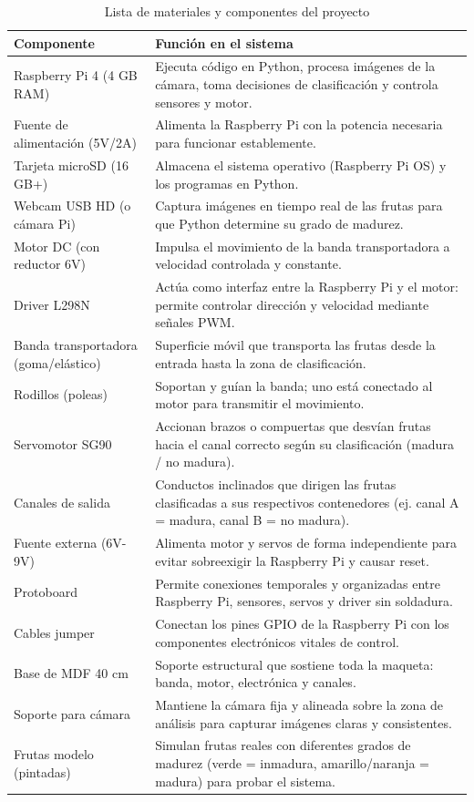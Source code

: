 \begin{table}[H]
\centering
\caption{Lista de materiales y componentes del proyecto}
\begin{tabular}{|p{}|p{}|}
\hline
\textbf{Componente} & \textbf{Función en el sistema} \\
\hline
Raspberry Pi 4 (4 GB RAM) & Ejecuta código en Python, procesa imágenes de la cámara, toma decisiones de clasificación y controla sensores y motor. \\
\hline
Fuente de alimentación (5V/2A) & Alimenta la Raspberry Pi con la potencia necesaria para funcionar establemente. \\
\hline
Tarjeta microSD (16 GB+) & Almacena el sistema operativo (Raspberry Pi OS) y los programas en Python. \\
\hline
Webcam USB HD (o cámara Pi) & Captura imágenes en tiempo real de las frutas para que Python determine su grado de madurez. \\
\hline
Motor DC (con reductor 6V) & Impulsa el movimiento de la banda transportadora a velocidad controlada y constante. \\
\hline
Driver L298N & Actúa como interfaz entre la Raspberry Pi y el motor: permite controlar dirección y velocidad mediante señales PWM. \\
\hline
Banda transportadora (goma/elástico) & Superficie móvil que transporta las frutas desde la entrada hasta la zona de clasificación. \\
\hline
Rodillos (poleas) & Soportan y guían la banda; uno está conectado al motor para transmitir el movimiento. \\
\hline
Servomotor SG90 & Accionan brazos o compuertas que desvían frutas hacia el canal correcto según su clasificación (madura / no madura). \\
\hline
Canales de salida & Conductos inclinados que dirigen las frutas clasificadas a sus respectivos contenedores (ej. canal A = madura, canal B = no madura). \\
\hline
Fuente externa (6V-9V) & Alimenta motor y servos de forma independiente para evitar sobreexigir la Raspberry Pi y causar reset. \\
\hline
Protoboard & Permite conexiones temporales y organizadas entre Raspberry Pi, sensores, servos y driver sin soldadura. \\
\hline
Cables jumper & Conectan los pines GPIO de la Raspberry Pi con los componentes electrónicos vitales de control. \\
\hline
Base de MDF 40 cm & Soporte estructural que sostiene toda la maqueta: banda, motor, electrónica y canales. \\
\hline
Soporte para cámara & Mantiene la cámara fija y alineada sobre la zona de análisis para capturar imágenes claras y consistentes. \\
\hline
Frutas modelo (pintadas) & Simulan frutas reales con diferentes grados de madurez (verde = inmadura, amarillo/naranja = madura) para probar el sistema. \\
\hline
\end{tabular}
\end{table}


